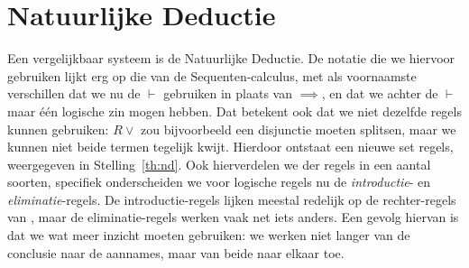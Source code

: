 \section{Natuurlijke Deductie}
Een vergelijkbaar systeem is de Natuurlijke Deductie. De notatie die we hiervoor gebruiken lijkt erg op die van de Sequenten-calculus, met als voornaamste verschillen dat we nu de $\vdash$ gebruiken in plaats van $\implies$, en dat we achter de $\vdash$ maar \'e\'en logische zin mogen hebben. Dat betekent ook dat we niet dezelfde regels kunnen gebruiken: $R\lor$ zou bijvoorbeeld een disjunctie moeten splitsen, maar we kunnen niet beide termen tegelijk kwijt. Hierdoor ontstaat een nieuwe set regels, weergegeven in Stelling~\ref{th:nd}. Ook hierverdelen we der regels in een aantal soorten, specifiek onderscheiden we voor logische regels nu de \emph{introductie}- en \emph{eliminatie}-regels. De introductie-regels lijken meestal redelijk op de rechter-regels van \lk{}, maar  de eliminatie-regels werken vaak net iets anders. Een gevolg hiervan is dat we wat meer inzicht moeten gebruiken: we werken niet langer van de conclusie naar de aannames, maar van beide naar elkaar toe.

